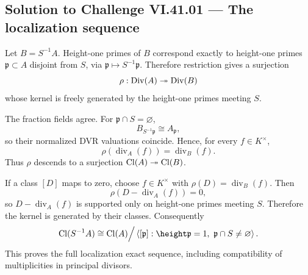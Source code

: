 
\subsection*{Solution to Challenge VI.41.01 — The localization sequence}
\begin{solution}
Let \(B=S^{-1}A\). Height-one primes of \(B\) correspond exactly to height-one
primes \(\mathfrak p\subset A\) disjoint from \(S\), via
\(\mathfrak p\mapsto S^{-1}\mathfrak p\). Therefore restriction gives a surjection
\[
\rho:\operatorname{Div}(A)\twoheadrightarrow\operatorname{Div}(B)
\]
whose kernel is freely generated by the height-one primes meeting \(S\).

The fraction fields agree. For \(\mathfrak p\cap S=\varnothing\),
\[
B_{S^{-1}\mathfrak p}\cong A_{\mathfrak p},
\]
so their normalized DVR valuations coincide. Hence, for every \(f\in K^\times\),
\[
\rho(\operatorname{div}_A(f))=\operatorname{div}_B(f).
\]
Thus \(\rho\) descends to a surjection \(\operatorname{Cl}(A)\twoheadrightarrow\operatorname{Cl}(B)\).

If a class \([D]\) maps to zero, choose \(f\in K^\times\) with
\(\rho(D)=\operatorname{div}_B(f)\). Then
\[
\rho(D-\operatorname{div}_A(f))=0,
\]
so \(D-\operatorname{div}_A(f)\) is supported only on height-one primes meeting
\(S\). Therefore the kernel is generated by their classes. Consequently
\[
\Cl(S^{-1}A)\cong
\Cl(A)\Big/\left\langle[\mathfrak p]:
\height\mathfrak p=1,\ \mathfrak p\cap S\ne\varnothing\right\rangle.
\]
This proves the full localization exact sequence, including compatibility of
multiplicities in principal divisors.
\end{solution}

